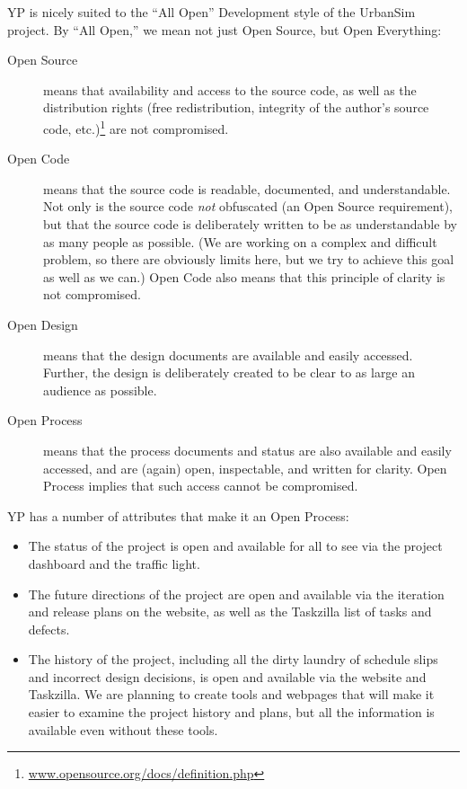 \documentclass[times, 10pt,twocolumn]{article}
\newcommand{\tight}{\itemsep 0pt}
\begin{document}
YP is nicely suited to the ``All Open'' Development style of the UrbanSim
project.  By ``All Open,'' we mean not just Open Source, but Open
Everything:

\begin{description}

\item[Open Source] means that availability and access to the source code,
as well as the distribution rights (free redistribution, integrity of the
author's source code,
etc.)\footnote{\url{www.opensource.org/docs/definition.php}} are 
not compromised.

\item[Open Code] means that the source code is readable, documented, and
understandable.  Not only is the source code \emph{not} obfuscated (an Open
Source requirement), but that the source code is deliberately written to be
as understandable by as many people as possible.  (We are working on a
complex and difficult problem, so there are obviously limits here, but we
try to achieve this goal as well as we can.)  Open Code also means that
this principle of clarity is not compromised.

\item[Open Design] means that the design documents are available and easily
accessed.  Further, the design is deliberately created to be clear to as
large an audience as possible.

\item[Open Process] means that the process documents and status are also
available and easily accessed, and are (again) open, inspectable,
and written for clarity.  Open Process implies that such access cannot be
compromised.

\end{description}

YP has a number of attributes that make it an Open Process:

\begin{itemize}
\tight
\item The status of the project is open and available for all to see via
the project dashboard and the traffic light.
\item The future directions of the project are open and available via
the iteration and release plans on the website, as well as the
Taskzilla list of tasks and defects.
\item The history of the project, including all the dirty laundry of 
schedule slips and incorrect design decisions, is open and available via 
the website and Taskzilla.  We are planning to create tools and webpages
that will make it easier to examine the project history and plans, but all the
information is available even without these tools.
\end{itemize}
\end{document}
